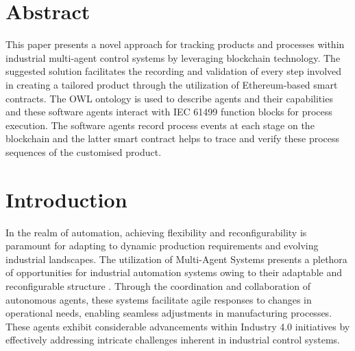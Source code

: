 \begin{bibunit}
\thispagestyle{plain}

\newcommand{\commentcolour}[3]{\textcolor{#3}{[\textbf{#1:} #2]}}
\newcommand{\commentVV}[1]{\commentcolour{VV}{#1}{orange}}
\newcommand{\VV}[1]{\textcolor{orange}{#1}}
\newcommand{\soutVV}[1]{\VV{\st{#1}}}
\newcommand{\corrVV}[2]{\st{#1} \VV{#2}}
\newcommand{\N}{{\mathbb N}}
\newcommand{\NN}{\mathcal N}
\newcommand{\etal}{\it et al. \normalfont}

\section*{Abstract}
    This paper presents a novel approach for tracking products and processes within industrial multi-agent control systems by leveraging blockchain technology. The suggested solution facilitates the recording and validation of every step involved in creating a tailored product through the utilization of Ethereum-based smart contracts. The OWL ontology is used to describe agents and their capabilities and these software agents interact with IEC 61499 function blocks for process execution. The software agents record process events at each stage on the blockchain and the latter smart contract helps to trace and verify these process sequences of the customised product.
    
    
\section{Introduction}

In the realm of automation, achieving flexibility and reconfigurability is paramount for adapting to dynamic production requirements and evolving industrial landscapes.
The utilization of Multi-Agent Systems presents a plethora of opportunities for industrial automation systems owing to their adaptable and reconfigurable structure \cite{NILSSON2023102450}. Through the coordination and collaboration of autonomous agents, these systems facilitate agile responses to changes in operational needs, enabling seamless adjustments in manufacturing processes. These agents exhibit considerable advancements within Industry 4.0 initiatives by effectively addressing intricate challenges inherent in industrial control systems\cite{mas_i40}.



\end{bibunit}
